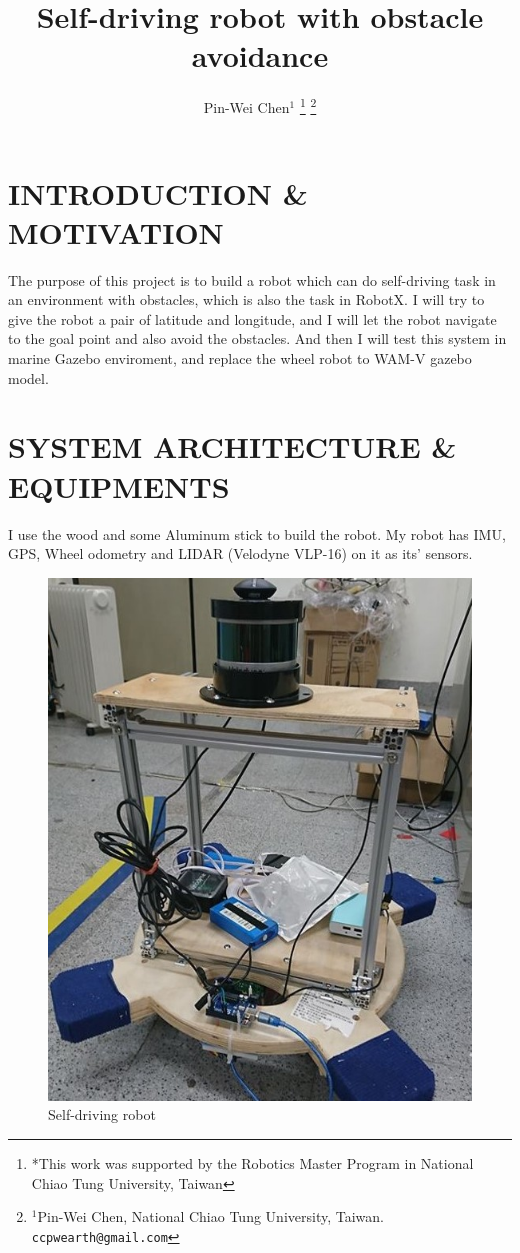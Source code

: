 \documentclass[letterpaper, 10 pt, conference]{ieeeconf}  %
\title{\LARGE \bf
Self-driving robot with obstacle avoidance
}
\author{Pin-Wei Chen$^{1}$%
\thanks{*This work was supported by the Robotics Master Program in National Chiao Tung University, Taiwan}%
\thanks{$^{1}$Pin-Wei Chen, National Chiao Tung University, Taiwan.		{\tt\small ccpwearth@gmail.com}}%
}
\begin{document}
\maketitle
\thispagestyle{empty}
\pagestyle{empty}


\section{INTRODUCTION \& MOTIVATION}

The purpose of this project is to build a robot which can do self-driving task in an environment with obstacles, which is also the task in RobotX. I will try to give the robot a pair of latitude and longitude, and I will let the robot navigate to the goal point and also avoid the obstacles. And then I will test this system in marine Gazebo enviroment, and replace the wheel robot to WAM-V gazebo model.

\section{SYSTEM ARCHITECTURE \& EQUIPMENTS}

I use the wood and some Aluminum stick to build the robot. My robot has IMU, GPS, Wheel odometry and LIDAR (Velodyne VLP-16) on it as its' sensors.


\begin{figure}[h] %
\includegraphics[width=0.6\columnwidth]{robot}
\centering
\caption{Self-driving robot}
\label{figure:robot}
\end{figure}
\end{document}
